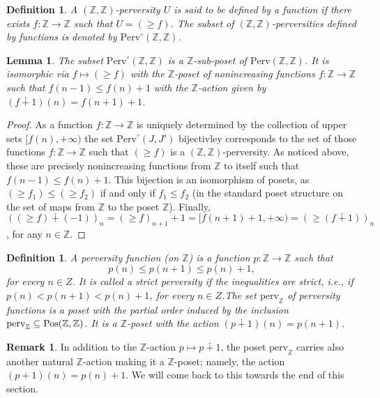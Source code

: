 \documentclass{article}
\newtheorem{lem}[thm]{Lemma}
\newtheorem{defn}[thm]{Definition}
\theoremstyle{definition}
\newtheorem{rem}[thm]{Remark}
\newcommand{\Z}{\mathbb{Z}}
\newcommand{\pos}{\textnormal{Pos}}
\begin{document}
\begin{defn}
A $(\Z,\Z)$-perversity $U$ is said to be defined by a function if there exists $f\colon \Z\to \Z$ such that $U=(\geq f)$. The subset of $(\Z,\Z)$-perversities defined by functions is denoted by $\mathrm{Perv}^\circ(\Z,\Z)$.
\end{defn}
\begin{lem}\label{lemma.perv0}
The subset $\mathrm{Perv}^\circ(\Z,\Z)$ is a $\Z$-sub-poset of $\mathrm{Perv}(\Z,\Z)$. It is isomorphic via $f\mapsto (\geq f)$ with the $\Z$-poset of nonincreasing functions $f\colon \Z\to \Z$ such that $f(n-1)\leq f(n)+1$ with the $\Z$-action given by $(f\dotplus 1)(n)=f(n+1)+1$.
\end{lem}
\begin{proof}
As a function $f\colon \Z\to \Z$ is uniquely determined by the collection of upper sets $[f(n),+\infty)$ the set $\mathrm{Perv}^\circ(J,J')$ bijectivley corresponds to the set of those functions $f\colon \Z\to \Z$ such that $(\geq f)$ is a $(\Z,\Z)$-perversity. As noticed above, these are precisely nonincreasing functions from $\Z$ to itself such that  $f(n-1)\leq f(n)+1$. This bijection is an isomorphism of posets, as $(\geq f_1)\leq (\geq f_2)$ if and only if $f_1\leq f_2$ (in the standard poset structure on the set of maps from $\Z$ to the poset $\Z$). Finally, $((\geq f)\dotplus (-1))_n=(\geq f)_{n+1}+1=[f(n+1)+1,+\infty)=(\geq (f\dotplus 1))_n$, for any $n\in \Z$.
\end{proof}

\begin{defn}\label{defperv}
A \emph{perversity function} (on $\Z$) is a function $p\colon \Z\to \Z$ such that
\[
p(n)\leq p(n+1)\leq p(n)+1,
\]
for every $n\in Z$. It is called a strict perversity if the inequalities are strict, i.e., if $p(n)< p(n+1)< p(n)+1$,
for every $n\in Z$.The set $\mathrm{perv}_\Z$ of perversity functions is a poset with the partial order induced by the inclusion $\mathrm{perv}_\Z\subseteq \pos(\Z,\Z)$. It is a $\Z$-poset with the action $(p\dotplus1)(n)=p(n+1)$. 
\end{defn}
\begin{rem}\label{other-action}
In addition to the $\Z$-action $p\mapsto p\dotplus 1$, the poset  $\mathrm{perv}_\Z$ carries also another natural $\Z$-action making it a $\Z$-poset; namely, the action $(p+1)(n)=p(n)+1$. We will come back to this towards the end of this section.
\end{rem}
\end{document}
